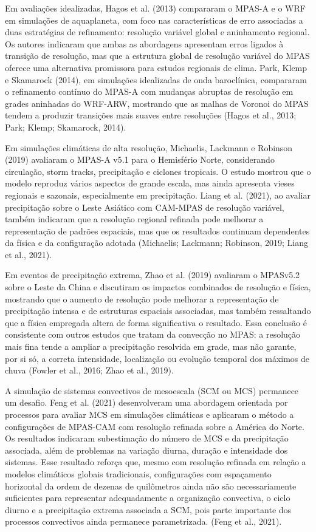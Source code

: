 \documentclass[12pt,a4paper,oneside]{book}
\begin{document}
Em avaliações idealizadas, Hagos et al. (2013) compararam o MPAS-A e o WRF em simulações de aquaplaneta, com foco nas características de erro associadas a duas estratégias de refinamento: resolução variável global e aninhamento regional. Os autores indicaram que ambas as abordagens apresentam erros ligados à transição de resolução, mas que a estrutura global de resolução variável do MPAS oferece uma alternativa promissora para estudos regionais de clima. Park, Klemp e Skamarock (2014), em simulações idealizadas de onda baroclínica, compararam o refinamento contínuo do MPAS-A com mudanças abruptas de resolução em grades aninhadas do WRF-ARW, mostrando que as malhas de Voronoi do MPAS tendem a produzir transições mais suaves entre resoluções (Hagos et al., 2013; Park; Klemp; Skamarock, 2014).

Em simulações climáticas de alta resolução, Michaelis, Lackmann e Robinson (2019) avaliaram o MPAS-A v5.1 para o Hemisfério Norte, considerando circulação, storm tracks, precipitação e ciclones tropicais. O estudo mostrou que o modelo reproduz vários aspectos de grande escala, mas ainda apresenta vieses regionais e sazonais, especialmente em precipitação. Liang et al. (2021), ao avaliar precipitação sobre o Leste Asiático com CAM-MPAS de resolução variável, também indicaram que a resolução regional refinada pode melhorar a representação de padrões espaciais, mas que os resultados continuam dependentes da física e da configuração adotada (Michaelis; Lackmann; Robinson, 2019; Liang et al., 2021).

Em eventos de precipitação extrema, Zhao et al. (2019) avaliaram o MPASv5.2 sobre o Leste da China e discutiram os impactos combinados de resolução e física, mostrando que o aumento de resolução pode melhorar a representação de precipitação intensa e de estruturas espaciais associadas, mas também ressaltando que a física empregada altera de forma significativa o resultado. Essa conclusão é consistente com outros estudos que tratam da convecção no MPAS: a resolução mais fina tende a ampliar a precipitação resolvida em grade, mas não garante, por si só, a correta intensidade, localização ou evolução temporal dos máximos de chuva (Fowler et al., 2016; Zhao et al., 2019).

A simulação de sistemas convectivos de mesoescala (SCM ou MCS) permanece um desafio. Feng et al. (2021) desenvolveram uma abordagem orientada por processos para avaliar MCS em simulações climáticas e aplicaram o método a configurações de MPAS-CAM com resolução refinada sobre a América do Norte. Os resultados indicaram subestimação do número de MCS e da precipitação associada, além de problemas na variação diurna, duração e intensidade dos sistemas. Esse resultado reforça que, mesmo com resolução refinada em relação a modelos climáticos globais tradicionais, configurações com espaçamento horizontal da ordem de dezenas de quilômetros ainda não são necessariamente suficientes para representar adequadamente a organização convectiva, o ciclo diurno e a precipitação extrema associada a SCM, pois parte importante dos processos convectivos ainda permanece parametrizada. (Feng et al., 2021).
\end{document}
